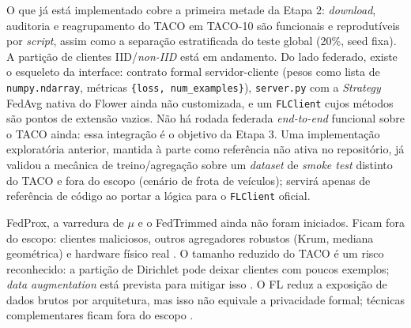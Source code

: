 \documentclass[conference]{IEEEtran}
\begin{document}
O que já está implementado cobre a primeira metade da Etapa 2: \textit{download}, auditoria e reagrupamento do TACO em TACO-10 são funcionais e reprodutíveis por \textit{script}, assim como a separação estratificada do teste global (20\%, seed fixa). A partição de clientes IID/\textit{non-IID} está em andamento. Do lado federado, existe o esqueleto da interface: contrato formal servidor-cliente (pesos como lista de \texttt{numpy.ndarray}, métricas \texttt{\{loss, num\_examples\}}), \texttt{server.py} com a \textit{Strategy} FedAvg nativa do Flower ainda não customizada, e um \texttt{FLClient} cujos métodos são pontos de extensão vazios. Não há rodada federada \textit{end-to-end} funcional sobre o TACO ainda: essa integração é o objetivo da Etapa 3. Uma implementação exploratória anterior, mantida à parte como referência não ativa no repositório, já validou a mecânica de treino/agregação sobre um \textit{dataset} de \textit{smoke test} distinto do TACO e fora do escopo (cenário de frota de veículos); servirá apenas de referência de código ao portar a lógica para o \texttt{FLClient} oficial.

FedProx, a varredura de $\mu$ e o FedTrimmed ainda não foram iniciados. Ficam fora do escopo: clientes maliciosos, outros agregadores robustos (Krum, mediana geométrica) e hardware físico real \cite{li2023byzantine}. O tamanho reduzido do TACO é um risco reconhecido: a partição de Dirichlet pode deixar clientes com poucos exemplos; \textit{data augmentation} está prevista para mitigar isso \cite{taco2020}. O FL reduz a exposição de dados brutos por arquitetura, mas isso não equivale a privacidade formal; técnicas complementares ficam fora do escopo \cite{kairouz2021}.



\end{document}

